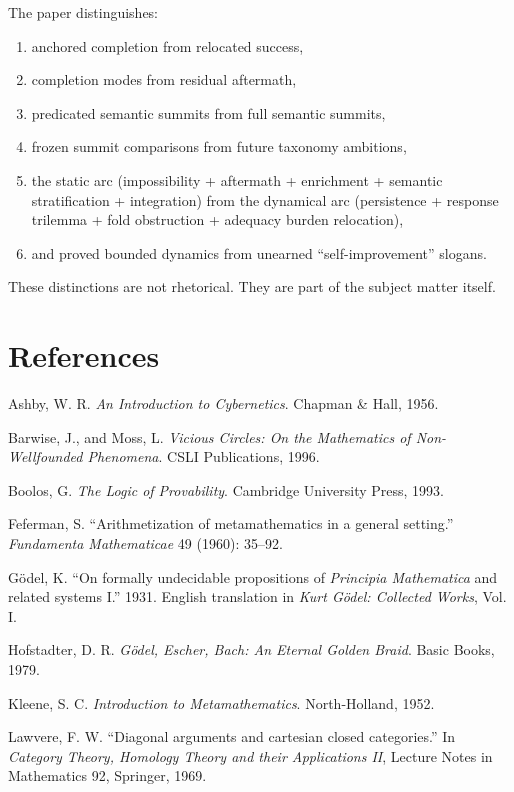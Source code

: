 \documentclass[11pt]{article}
\theoremstyle{plain}
\theoremstyle{definition}
\theoremstyle{remark}
\begin{document}
The paper distinguishes:
\begin{enumerate}[label=(\alph*)]
\item anchored completion from relocated success,
\item completion modes from residual aftermath,
\item predicated semantic summits from full semantic summits,
\item frozen summit comparisons from future taxonomy ambitions,
\item the static arc (impossibility + aftermath + enrichment + semantic stratification + integration) from the dynamical arc (persistence + response trilemma + fold obstruction + adequacy burden relocation),
\item and proved bounded dynamics from unearned ``self-improvement'' slogans.
\end{enumerate}

These distinctions are not rhetorical. They are part of the subject matter itself.

\section*{References}

\noindent
Ashby, W. R. \emph{An Introduction to Cybernetics}. Chapman \& Hall, 1956.

\medskip
Barwise, J., and Moss, L. \emph{Vicious Circles: On the Mathematics of Non-Wellfounded Phenomena}. CSLI Publications, 1996.

\medskip
Boolos, G. \emph{The Logic of Provability}. Cambridge University Press, 1993.

\medskip
Feferman, S. ``Arithmetization of metamathematics in a general setting.'' \emph{Fundamenta Mathematicae} 49 (1960): 35--92.

\medskip
Gödel, K. ``On formally undecidable propositions of \emph{Principia Mathematica} and related systems I.'' 1931. English translation in \emph{Kurt Gödel: Collected Works}, Vol. I.

\medskip
Hofstadter, D. R. \emph{Gödel, Escher, Bach: An Eternal Golden Braid}. Basic Books, 1979.

\medskip
Kleene, S. C. \emph{Introduction to Metamathematics}. North-Holland, 1952.

\medskip
Lawvere, F. W. ``Diagonal arguments and cartesian closed categories.'' In \emph{Category Theory, Homology Theory and their Applications II}, Lecture Notes in Mathematics 92, Springer, 1969.
\end{document}
